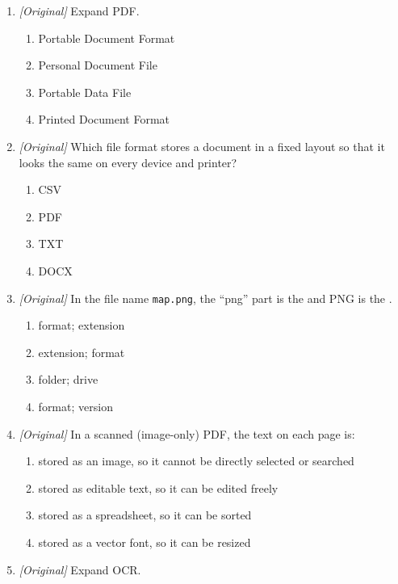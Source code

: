 \begin{enumerate}[label=\textbf{Q\arabic*.}, leftmargin=*]
\item \textit{[Original]} Expand PDF.
  \begin{enumerate}[label=\Alph*.]
    \item Portable Document Format
    \item Personal Document File
    \item Portable Data File
    \item Printed Document Format
  \end{enumerate}
\item \textit{[Original]} Which file format stores a document in a fixed
  layout so that it looks the same on every device and printer?
  \begin{enumerate}[label=\Alph*.]
    \item CSV
    \item PDF
    \item TXT
    \item DOCX
  \end{enumerate}
\item \textit{[Original]} In the file name \texttt{map.png}, the ``png'' part
  is the \underline{\hspace{1.8cm}} and PNG is the \underline{\hspace{1.8cm}}.
  \begin{enumerate}[label=\Alph*.]
    \item format; extension
    \item extension; format
    \item folder; drive
    \item format; version
  \end{enumerate}
\item \textit{[Original]} In a scanned (image-only) PDF, the text on each
  page is:
  \begin{enumerate}[label=\Alph*.]
    \item stored as an image, so it cannot be directly selected or searched
    \item stored as editable text, so it can be edited freely
    \item stored as a spreadsheet, so it can be sorted
    \item stored as a vector font, so it can be resized
  \end{enumerate}
\item \textit{[Original]} Expand OCR.
  \begin{enumerate}[label=\Alph*.]

\end{enumerate}
\end{enumerate}
